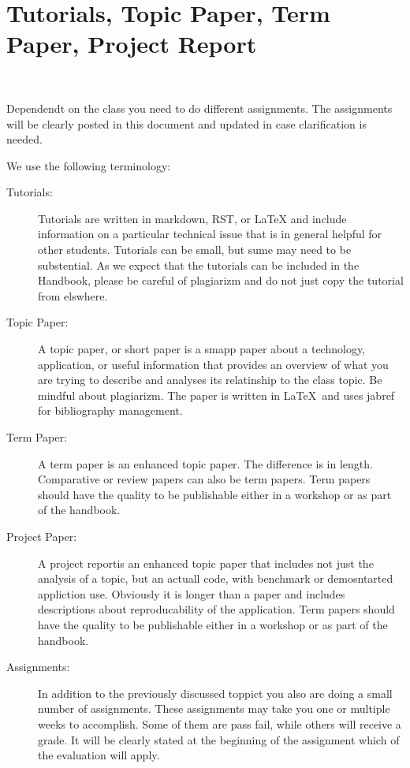 
\section{Tutorials, Topic Paper, Term Paper, Project Report}
\label{s:project-format}

\FILENAME\

Dependendt on the class you need to do different assignments. The
assignments will be clearly posted in this document and updated in
case clarification is needed. 

We use the following terminology:

\begin{description}

\item[Tutorials:] Tutorials are written in markdown, RST, or LaTeX and
  include information on a particular technical issue that is in
  general helpful for other students. Tutorials can be small, but sume
  may need to be substential. As we expect that the tutorials can be
  included in the Handbook, please be careful of plagiarizm and do not
  just copy the tutorial from elswhere. 

\item[Topic Paper:] A topic paper, or short paper is a smapp paper
  about a technology, application, or useful information that provides
  an overview of what you are trying to describe and analyses its
  relatinship to the class topic. Be mindful about plagiarizm. The
  paper is written in \LaTeX~and uses jabref for bibliography management.

\item[Term Paper:] A term paper is an enhanced topic paper. The
  difference is in length. Comparative or review papers can also be
  term papers.  Term papers should have the quality to be publishable
  either in a workshop or as part of the handbook.

\item[Project Paper:] A project reportis an enhanced topic paper that
  includes not just the analysis of a topic, but an actuall code, with
  benchmark or demosntarted appliction use. Obviously it is longer
  than a paper and includes descriptions about reproducability of the
  application. Term papers should have the quality to be publishable
  either in a workshop or as part of the handbook.

\item[Assignments:] In addition to the previously discussed toppict
  you also are doing a small number of assignments. These assignments
  may take you one or multiple weeks to accomplish. Some of them are
  pass fail, while others will receive a grade. It will be clearly
  stated at the beginning of the assignment which of the evaluation
  will apply.

\end{description}

